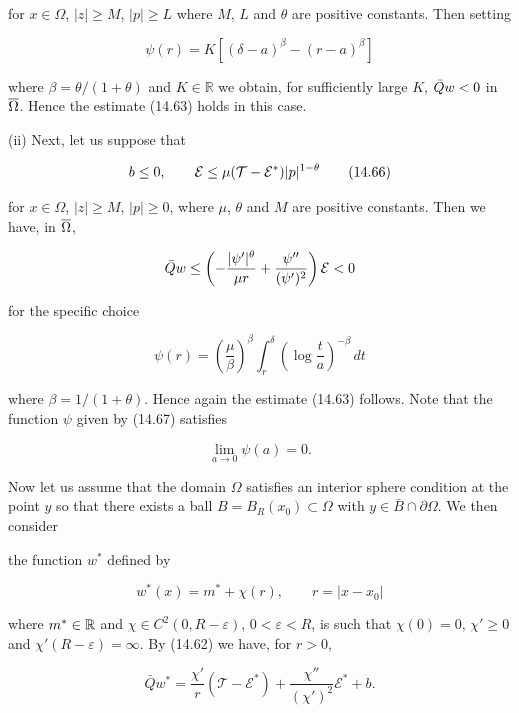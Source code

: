 for $x\in\Omega$, $|z|\geq M$, $|p|\geq L$ where $M$, $L$ and $\theta$ are positive constants. Then setting

\begin{equation}
\psi(r)=K[(\delta-a)^\beta-(r-a)^\beta]
\tag{14.65}
\end{equation}

where $\beta=\theta/(1+\theta)$ and $K\in\mathbb{R}$ we obtain, for sufficiently large $K$, $\bar{Q} w<0$ in $\overline{\Omega}$. Hence the estimate (14.63) holds in this case.

(ii) Next, let us suppose that

\begin{equation}
b\leq 0,
\qquad
\mathcal{E}\leq \mu(\mathcal{T}-\mathcal{E}^\ast)|p|^{1-\theta}
\tag{14.66}
\end{equation}

for $x\in\Omega$, $|z|\geq M$, $|p|\geq 0$, where $\mu$, $\theta$ and $M$ are positive constants. Then we have, in $\overline{\Omega}$,

\[
\bar{Q} w\leq \left(-\frac{|\psi'|^\theta}{\mu r}+\frac{\psi''}{(\psi')^2}\right)\mathcal{E}<0
\]

for the specific choice

\begin{equation}
\psi(r)=\left(\frac{\mu}{\beta}\right)^\beta\int_r^\delta \left(\log\frac{t}{a}\right)^{-\beta}\,dt
\tag{14.67}
\end{equation}

where $\beta=1/(1+\theta)$. Hence again the estimate (14.63) follows. Note that the function $\psi$ given by (14.67) satisfies

\[
\lim_{a\to 0}\psi(a)=0.
\]

Now let us assume that the domain $\Omega$ satisfies an interior sphere condition at the point $y$ so that there exists a ball $B=B_R(x_0)\subset\Omega$ with $y\in\bar{B}\cap\partial\Omega$. We then consider




the function $w^{*}$ defined by

\begin{equation}
w^{*}(x)=m^{*}+\chi(r), \qquad r=|x-x_{0}|
\tag{14.68}
\end{equation}

where $m^{*}\in\mathbb{R}$ and $\chi\in C^{2}(0, R-\varepsilon)$, $0<\varepsilon<R$, is such that $\chi(0)=0$, $\chi'\geq 0$ and $\chi'(R-\varepsilon)=\infty$. By (14.62) we have, for $r>0$,

\begin{equation}
\bar{Q}w^{*}=\frac{\chi'}{r}\left(\mathcal{T}-\mathcal{E}^{*}\right)+\frac{\chi''}{(\chi')^{2}}\mathcal{E}^{*}+b.
\tag{14.69}
\end{equation}

